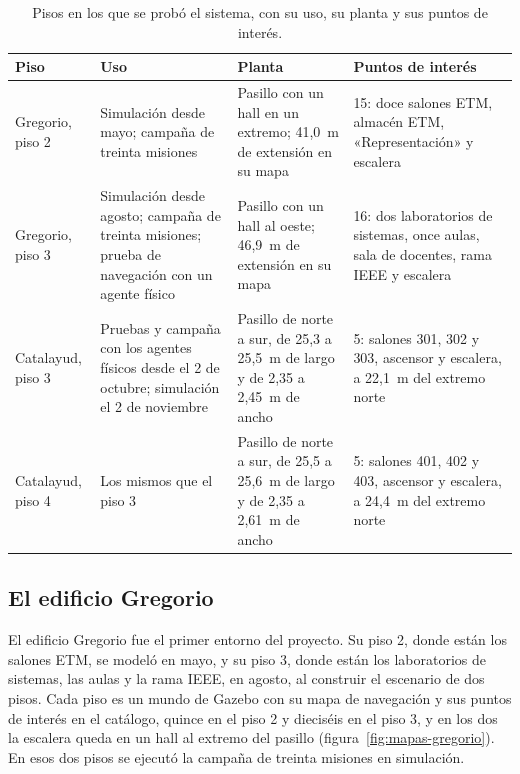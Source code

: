 \begin{table}[H]
  \centering\footnotesize
  \caption{Pisos en los que se probó el sistema, con su uso, su planta y sus puntos de interés.}
  \label{tab:entornos}
  \begin{tabular}{@{}p{}p{}p{}p{}@{}}
    \toprule
    \textbf{Piso} & \textbf{Uso} & \textbf{Planta} & \textbf{Puntos de interés} \\ \midrule
    Gregorio, piso 2 & Simulación desde mayo; campaña de treinta misiones & Pasillo con un hall en un extremo; 41,0~m de extensión en su mapa & 15: doce salones ETM, almacén ETM, «Representación» y escalera \\ \addlinespace
    Gregorio, piso 3 & Simulación desde agosto; campaña de treinta misiones; prueba de navegación con un agente físico & Pasillo con un hall al oeste; 46,9~m de extensión en su mapa & 16: dos laboratorios de sistemas, once aulas, sala de docentes, rama IEEE y escalera \\ \addlinespace
    Catalayud, piso 3 & Pruebas y campaña con los agentes físicos desde el 2 de octubre; simulación el 2 de noviembre & Pasillo de norte a sur, de 25,3 a 25,5~m de largo y de 2,35 a 2,45~m de ancho & 5: salones 301, 302 y 303, ascensor y escalera, a 22,1~m del extremo norte \\ \addlinespace
    Catalayud, piso 4 & Los mismos que el piso 3 & Pasillo de norte a sur, de 25,5 a 25,6~m de largo y de 2,35 a 2,61~m de ancho & 5: salones 401, 402 y 403, ascensor y escalera, a 24,4~m del extremo norte \\ \bottomrule
  \end{tabular}
\end{table}

\subsection{El edificio Gregorio}
\label{sec:gregorio}

El edificio Gregorio fue el primer entorno del proyecto. Su piso 2, donde están los salones ETM, se modeló en mayo, y su piso 3, donde
están los laboratorios de sistemas, las aulas y la rama IEEE, en agosto, al construir el escenario de dos pisos. Cada piso es un mundo
de Gazebo con su mapa de navegación y sus puntos de interés en el catálogo, quince en el piso 2 y dieciséis en el piso 3, y en los dos la
escalera queda en un hall al extremo del pasillo (figura~\ref{fig:mapas-gregorio}). En esos dos pisos se ejecutó la campaña de treinta
misiones en simulación.

